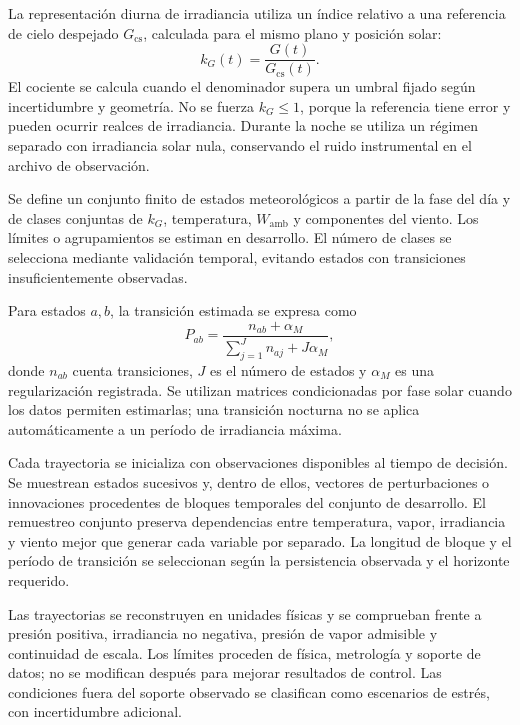La representación diurna de irradiancia utiliza un índice relativo a una referencia de cielo despejado $G_{\mathrm{cs}}$, calculada para el mismo plano y posición solar:
\begin{equation}
k_G(t)=\frac{G(t)}{G_{\mathrm{cs}}(t)}.
\label{met:indice_cielo}
\end{equation}
El cociente se calcula cuando el denominador supera un umbral fijado según incertidumbre y geometría. No se fuerza $k_G\leq1$, porque la referencia tiene error y pueden ocurrir realces de irradiancia. Durante la noche se utiliza un régimen separado con irradiancia solar nula, conservando el ruido instrumental en el archivo de observación.

Se define un conjunto finito de estados meteorológicos a partir de la fase del día y de clases conjuntas de $k_G$, temperatura, $W_{\mathrm{amb}}$ y componentes del viento. Los límites o agrupamientos se estiman en desarrollo. El número de clases se selecciona mediante validación temporal, evitando estados con transiciones insuficientemente observadas.

Para estados $a,b$, la transición estimada se expresa como
\begin{equation}
\widehat P_{ab}=
\frac{n_{ab}+\alpha_M}
{\sum_{j=1}^{J}n_{aj}+J\alpha_M},
\label{met:transicion_markov}
\end{equation}
donde $n_{ab}$ cuenta transiciones, $J$ es el número de estados y $\alpha_M$ es una regularización registrada. Se utilizan matrices condicionadas por fase solar cuando los datos permiten estimarlas; una transición nocturna no se aplica automáticamente a un período de irradiancia máxima.

Cada trayectoria se inicializa con observaciones disponibles al tiempo de decisión. Se muestrean estados sucesivos y, dentro de ellos, vectores de perturbaciones o innovaciones procedentes de bloques temporales del conjunto de desarrollo. El remuestreo conjunto preserva dependencias entre temperatura, vapor, irradiancia y viento mejor que generar cada variable por separado. La longitud de bloque y el período de transición se seleccionan según la persistencia observada y el horizonte requerido.

Las trayectorias se reconstruyen en unidades físicas y se comprueban frente a presión positiva, irradiancia no negativa, presión de vapor admisible y continuidad de escala. Los límites proceden de física, metrología y soporte de datos; no se modifican después para mejorar resultados de control. Las condiciones fuera del soporte observado se clasifican como escenarios de estrés, con incertidumbre adicional.

